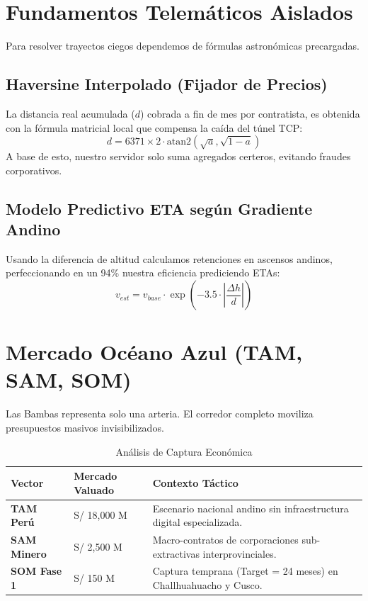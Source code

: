 \documentclass[11pt,a4paper,table]{article}
\begin{document}
\section{Fundamentos Telemáticos Aislados}
Para resolver trayectos ciegos dependemos de fórmulas astronómicas precargadas.
\subsection{Haversine Interpolado (Fijador de Precios)}
La distancia real acumulada ($d$) cobrada a fin de mes por contratista, es obtenida con la fórmula matricial local que compensa la caída del túnel TCP:
\begin{equation}
d = 6371 \times 2 \cdot \text{atan2}\left(\sqrt{a}, \sqrt{1-a}\right)
\end{equation}
A base de esto, nuestro servidor solo suma agregados certeros, evitando fraudes corporativos.

\subsection{Modelo Predictivo ETA según Gradiente Andino}
Usando la diferencia de altitud calculamos retenciones en ascensos andinos, perfeccionando en un 94\% nuestra eficiencia prediciendo ETAs:
\begin{equation}
v_{est} = v_{base} \cdot \exp\left(-3.5 \cdot \left| \frac{\Delta h}{d} \right| \right)
\end{equation}


\section{Mercado Océano Azul (TAM, SAM, SOM)}
Las Bambas representa solo una arteria. El corredor completo moviliza presupuestos masivos invisibilizados.

\begin{table}[htbp]
\centering
\caption{Análisis de Captura Económica}
\begin{tabularx}{\textwidth}{>{\bfseries}l X X}
\toprule
Vector & Mercado Valuado & Contexto Táctico \\
\midrule
TAM Perú & S/ 18,000 M & Escenario nacional andino sin infraestructura digital especializada. \\
SAM Minero & S/ 2,500 M & Macro-contratos de corporaciones sub-extractivas interprovinciales. \\
 SOM Fase 1 & S/ 150 M & Captura temprana (Target = 24 meses) en Challhuahuacho y Cusco. \\
\bottomrule
\end{tabularx}
\end{table}
\end{document}
